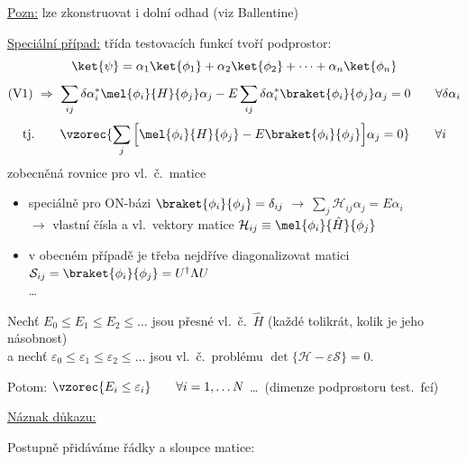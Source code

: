\underline{Pozn:} lze zkonstruovat i dolní odhad (viz Ballentine)

\underline{Speciální případ:} třída testovacích funkcí tvoří podprostor:
\[
  \ket{\psi} = \alpha_1\ket{\phi_1} + \alpha_2\ket{\phi_2} + \dots + \alpha_n\ket{\phi_n}
\]
\[
  \text{(V1)}\ \Rightarrow\ \sum_{ij}\delta\alpha_i^*\mel{\phi_i}{H}{\phi_j}\alpha_j - E\sum_{ij}\delta\alpha_i^*\braket{\phi_i}{\phi_j}\alpha_j = 0 \qquad \forall\delta\alpha_i
\]
\[
  \text{tj.}\qquad \vzorec{\sum_j\Big[\mel{\phi_i}{H}{\phi_j} - E\braket{\phi_i}{\phi_j}\Big]\alpha_j = 0} \qquad \forall i
\]
zobecněná rovnice pro vl.\ č.\ matice \quad {}
\begin{itemize}
  \item speciálně pro ON-bázi $\braket{\phi_i}{\phi_j} = \delta_{ij}$ \quad $\to\ \sum_j\mathcal{H}_{ij}\alpha_j = E\alpha_i$ \\
        $\to$ vlastní čísla a vl.\ vektory matice $\mathcal{H}_{ij} \equiv \mel{\phi_i}{\hat H}{\phi_j}$
  \item v obecném případě je třeba nejdříve diagonalizovat matici $\mathcal{S}_{ij} = \braket{\phi_i}{\phi_j} = U^\dagger\Lambda U$ \\
        \dots\ 
\end{itemize}

\begin{veta}
Nechť $E_0\leq E_1\leq E_2\leq\dots$ jsou přesné vl.\ č.\ $\hat H$ (každé tolikrát, kolik je jeho násobnost) \\
a nechť $\varepsilon_0\leq\varepsilon_1\leq\varepsilon_2\leq\dots$ jsou vl.\ č.\ problému $\det\{\mathcal{H} - \varepsilon\mathcal{S}\} = 0$.

Potom: \qquad $\vzorec{E_i \leq \varepsilon_i} \qquad \forall i = 1,\dots N$ \quad \dots\ (dimenze podprostoru test.\ fcí)
\end{veta}

\underline{Náznak důkazu:}

\begin{minipage}{0.55\textwidth}
Postupně přidáváme řádky a sloupce matice:
\end{minipage}
\begin{minipage}{0.4\textwidth}
\end{minipage}

